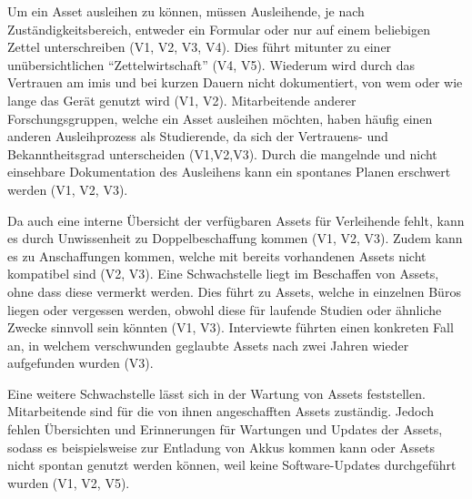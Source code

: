 Um ein Asset ausleihen zu können, müssen Ausleihende, je nach Zuständigkeitsbereich, entweder ein
Formular oder nur auf einem beliebigen Zettel unterschreiben (V1, V2, V3, V4). Dies führt mitunter
zu einer unübersichtlichen \enquote{Zettelwirtschaft} (V4, V5). Wiederum wird durch das Vertrauen am
\ac{imis} und bei kurzen Dauern nicht dokumentiert, von wem oder wie lange das Gerät genutzt wird
(V1, V2). Mitarbeitende anderer Forschungsgruppen, welche ein Asset ausleihen möchten, haben häufig
einen anderen Ausleihprozess als Studierende, da sich der Vertrauens- und Bekanntheitsgrad
unterscheiden (V1,V2,V3). Durch die mangelnde und nicht einsehbare Dokumentation des Ausleihens kann
ein spontanes Planen erschwert werden (V1, V2, V3).

Da auch eine interne Übersicht der verfügbaren Assets für Verleihende fehlt, kann es durch
Unwissenheit zu Doppelbeschaffung kommen (V1, V2, V3). Zudem kann es zu Anschaffungen kommen, welche
mit bereits vorhandenen Assets nicht kompatibel sind (V2, V3). Eine Schwachstelle liegt im
Beschaffen von Assets, ohne dass diese vermerkt werden. Dies führt zu Assets, welche in einzelnen
Büros liegen oder vergessen werden, obwohl diese für laufende Studien oder ähnliche Zwecke sinnvoll
sein könnten (V1, V3). Interviewte führten einen konkreten Fall an, in welchem verschwunden geglaubte
Assets nach zwei Jahren wieder aufgefunden wurden (V3).

Eine weitere Schwachstelle lässt sich in der Wartung von Assets feststellen.
Mitarbeitende sind für die von ihnen angeschafften Assets zuständig. Jedoch
fehlen Übersichten und Erinnerungen für Wartungen und Updates der Assets, sodass
es beispielsweise zur Entladung von Akkus kommen kann oder Assets nicht spontan
genutzt werden können, weil keine Software-Updates durchgeführt wurden (V1, V2,
V5).

